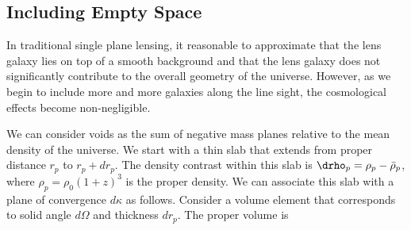 \subsection{Including Empty Space}
In traditional single plane lensing, it reasonable to approximate that the lens galaxy lies on top of a smooth background and that the lens galaxy does not significantly contribute to the overall geometry of the universe. However, as we begin to include more and more galaxies along the line sight, the cosmological effects become non-negligible.


We can consider voids as the sum of negative mass planes relative to the mean density of the universe. We start with a thin slab that extends from proper distance $r_p$ to $r_p+dr_p$.  The density contrast within this slab is $\drho_p = \rho_p - \bar\rho_p$, where $\rho_p = \rho_0 (1+z)^3$ is the proper density.  We can associate this slab with a plane of convergence $d\kappa$ as follows.  Consider a volume element that corresponds to solid angle $d\Omega$ and thickness $dr_p$.  The proper volume is
  